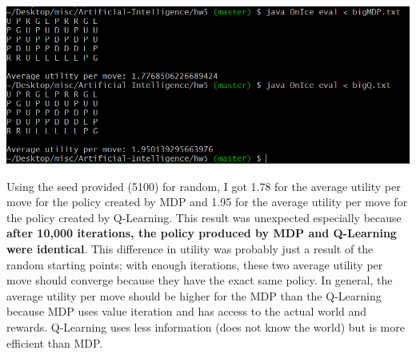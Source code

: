 \documentclass[12pt]{article}
\begin{document}
\thispagestyle{fancy}

\includegraphics[scale=1.0]{results}

Using the seed provided (5100) for random, I got 1.78 for the average utility per move for the policy created by MDP and 1.95 for the average utility per move for the policy created by Q-Learning. This result was unexpected especially because \textbf{after 10,000 iterations, the policy produced by MDP and Q-Learning were identical}. This difference in utility was probably just a result of the random starting points; with enough iterations, these two average utility per move should converge because they have the exact same policy. In general, the average utility per move should be higher for the MDP than the Q-Learning because MDP uses value iteration and has access to the actual world and rewards. Q-Learning uses less information (does not know the world) but is more efficient than MDP.
\end{document}
